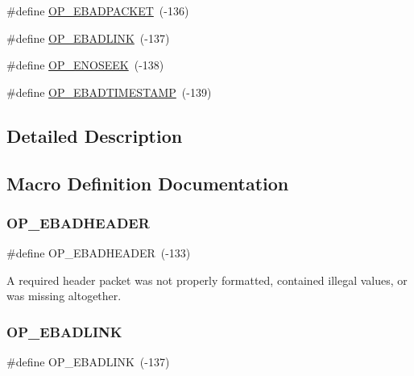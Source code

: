 \begin{DoxyCompactItemize}
\item 
\#define \hyperlink{group__error__codes_gaa3fa0a3e6facc4f47924271e65bb21ff}{O\+P\+\_\+\+E\+B\+A\+D\+P\+A\+C\+K\+ET}~(-\/136)
\item 
\#define \hyperlink{group__error__codes_gaf7b58a439a471366e9eb5b8f2a8cd041}{O\+P\+\_\+\+E\+B\+A\+D\+L\+I\+NK}~(-\/137)
\item 
\#define \hyperlink{group__error__codes_gadd54f4d82cfabedb5963331fbe0bc99c}{O\+P\+\_\+\+E\+N\+O\+S\+E\+EK}~(-\/138)
\item 
\#define \hyperlink{group__error__codes_gaf82657fc888f1dcf2e0d8f066b8a6cc7}{O\+P\+\_\+\+E\+B\+A\+D\+T\+I\+M\+E\+S\+T\+A\+MP}~(-\/139)
\end{DoxyCompactItemize}


\subsection{Detailed Description}


\subsection{Macro Definition Documentation}
\mbox{\label{group__error__codes_ga534f1b45c8733a2928434e482b38869f}} 
\subsubsection{\texorpdfstring{O\+P\+\_\+\+E\+B\+A\+D\+H\+E\+A\+D\+ER}{OP\_EBADHEADER}}
{\footnotesize\ttfamily \#define O\+P\+\_\+\+E\+B\+A\+D\+H\+E\+A\+D\+ER~(-\/133)}

A required header packet was not properly formatted, contained illegal values, or was missing altogether. \mbox{\label{group__error__codes_gaf7b58a439a471366e9eb5b8f2a8cd041}} 
\subsubsection{\texorpdfstring{O\+P\+\_\+\+E\+B\+A\+D\+L\+I\+NK}{OP\_EBADLINK}}
{\footnotesize\ttfamily \#define O\+P\+\_\+\+E\+B\+A\+D\+L\+I\+NK~(-\/137)}

